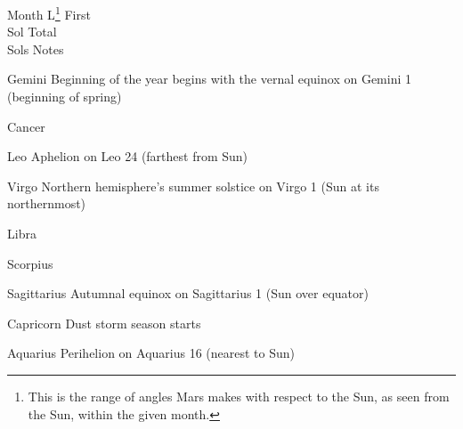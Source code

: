 {
    \bTABLE[split=repeat,option=stretch]
    \setupTABLE[column][5]
        [width=.52\textwidth,
        align=yes]
    \setupTABLE[row][each][align=center]
    \setupTABLE[5][1][align=center]

\bTABLEhead
    \bTR[bottomframe=on]
      \bTH  Month \eTH
      \bTH  L\footnote{This is the range of angles Mars makes with respect to the Sun, as seen from the Sun, within the given month.} \eTH
      \bTH  First\\Sol \eTH
      \bTH  Total\\Sols \eTH
      \bTH  Notes \eTH
    \eTR
\eTABLEhead

\bTABLEbody
    \bTR
      \bTC Gemini \eTC
      \bTC \math{[0^{\circ}, 30^{\circ})}\eTC
       \eTC
       \eTC
      \bTC Beginning of the year begins with the vernal equinox on Gemini 1 (beginning of spring)\eTC
    \eTR
    
    \bTR
      \bTC Cancer \eTC
      \bTC \math{[30^{\circ}, 60^{\circ})} \eTC
       \eTC
       \eTC
      \bTC  \eTC
    \eTR
    
    \bTR
      \bTC Leo \eTC
      \bTC \math{[60^{\circ}, 90^{\circ})} \eTC
       \eTC
       \eTC
      \bTC Aphelion on Leo 24 (farthest from Sun)\eTC
    \eTR
    
    \bTR
      \bTC Virgo \eTC
      \bTC \math{[90^{\circ}, 120^{\circ})} \eTC
       \eTC
       \eTC
      \bTC Northern hemisphere's summer solstice on Virgo 1 (Sun at its northernmost)\eTC
    \eTR
    
    \bTR
      \bTC Libra \eTC
      \bTC \math{[120^{\circ}, 150^{\circ})} \eTC
       \eTC
       \eTC
      \bTC  \eTC
    \eTR
    
    \bTR
      \bTC Scorpius \eTC
      \bTC \math{[150^{\circ}, 180^{\circ})} \eTC
       \eTC
       \eTC
      \bTC  \eTC
    \eTR
    
    \bTR
      \bTC Sagittarius \eTC
      \bTC \math{[180^{\circ}, 210^{\circ})} \eTC
       \eTC
       \eTC
      \bTC Autumnal equinox on Sagittarius 1 (Sun over equator)\eTC
    \eTR
    
    \bTR
      \bTC Capricorn \eTC
      \bTC \math{[210^{\circ}, 240^{\circ})} \eTC
       \eTC
       \eTC
      \bTC Dust storm season starts \eTC
    \eTR
    
    \bTR
      \bTC Aquarius \eTC
      \bTC \math{[240^{\circ}, 270^{\circ})} \eTC
       \eTC
       \eTC
      \bTC Perihelion on Aquarius 16 (nearest to Sun)\eTC
    \eTR
    
}
